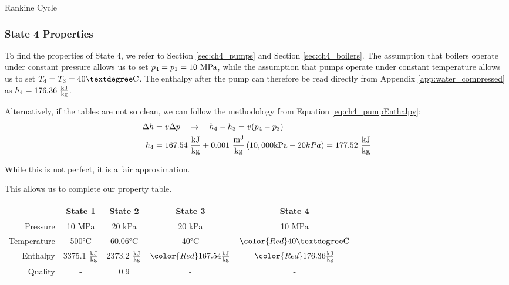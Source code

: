\begin{example}[label=ex:RankineCycle]{Rankine Cycle}
\subsubsection*{State 4 Properties}

To find the properties of State 4, we refer to Section \ref{sec:ch4_pumps} and Section \ref{sec:ch4_boilers}.  The assumption that boilers operate under constant pressure allows us to set $p_4 = p_1 = 10\ \rm MPa$, while the assumption that pumps operate under constant temperature allows us to set $T_4 = T_3 = 40\rm °C$.  The enthalpy after the pump can therefore be read directly from Appendix \ref{app:water_compressed} as $h_4 = 176.36\ \frac{\rm kJ}{\rm kg}$.

Alternatively, if the tables are not so clean, we can follow the methodology from Equation \ref{eq:ch4_pumpEnthalpy}:
\begin{align*}
  \Delta h &= v\Delta p \quad \rightarrow \quad h_4 - h_3 = v(p_4 - p_3) \\
  h_4 &= 167.54\ \frac{\rm kJ}{\rm kg} + 0.001\ \frac{\rm m^3}{\rm kg} \left(10,000 {\rm kPa} - 20 kPa \right) = 177.52\ \frac{\rm kJ}{\rm kg} 
\end{align*}

While this is not perfect, it is a fair approximation.

This allows us to complete our property table.
  \begin{table}[H]
    \centering
    \def\arraystretch{1.5}
    \begin{tabular}{r|cccc}
      & State 1 & State 2 & State 3 & State 4 \\ \hline
      Pressure    & 10 MPa  & 20 kPa  &  {\color{Red} 20 kPa} &  {\color{Red} 10 MPa}       \\
      Temperature & 500°C   & 60.06°C &  40°C   & ${\color{Red} 40{\rm °C}}$  \\
      Enthalpy    & 3375.1 $\frac{\rm kJ}{\rm kg}$  & 2373.2 $\frac{\rm kJ}{\rm kg}$  &  $\color{Red} 167.54 \frac{\rm kJ}{\rm kg}$  & $\color{Red}176.36 \frac{\rm kJ}{\rm kg}$     \\
      Quality     & -       & 0.9     &   -      &  -
    \end{tabular}
    \def\arraystretch{1.0}
  \end{table}

\end{example}
